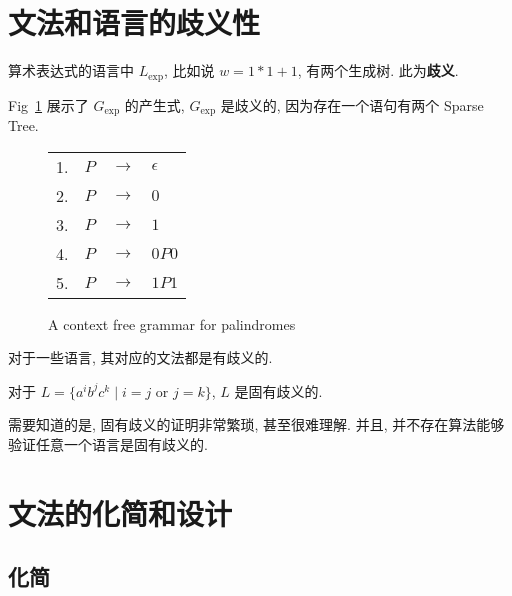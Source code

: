 \documentclass[../main_part1.tex]{subfiles}
\begin{document}

\section{文法和语言的歧义性}\label{sec:文法和语言的歧义性}
\noindent 算术表达式的语言中 \(L_{\text{exp}}\), 比如说 \(w = 1 * 1 + 1\), 有两个生成树. 此为\textbf{歧义}.


\begin{exam}[表示加法乘法的优先级]
	Fig~\ref{fig:exp} 展示了 \(G_{\text{exp}}\) 的产生式, \(G _{\text{exp}}\) 是歧义的, 因为存在一个语句有两个 Sparse Tree.
\begin{figure}
	\centering
	\begin{tabular}{cccl}
		1. & \(P \) & \(\to\) & \(\epsilon\) \\ 
		2. & \(P\) & \(\to\) & \(0\)\\
		3. & \(P\) & \(\to\) & \(1\)\\
		4. & \(P\) & \(\to\) & \(0P0\)\\
		5. & \(P\) & \(\to\) & \(1P1\)\\
	\end{tabular}
	\caption{A context free grammar for palindromes}
	\label{fig:exp}
\end{figure}
\end{exam}

\begin{definition}[固有歧义]\label{def:固有歧义}
	对于一些语言, 其对应的文法都是有歧义的.
\end{definition}

\begin{exam}
	对于 \(L = \{ a ^{i }  b ^{j} c ^{k} \mid i =  j \text{ or } j = k \} \), \(L\) 是固有歧义的. 

	需要知道的是, 固有歧义的证明非常繁琐, 甚至很难理解. 并且, 并不存在算法能够验证任意一个语言是固有歧义的. 
\end{exam}


\section{文法的化简和设计}
\label{sec:文法的化简和设计}
\subsection{化简}
\end{document}
